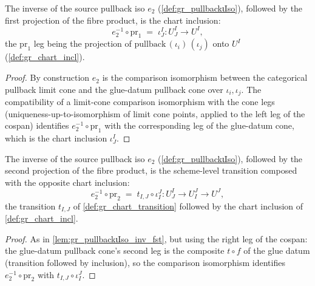 \begin{lemma}\leanok
  \label{lem:gr_pullbackιIso_inv_fst}
  The inverse of the source pullback iso \(e_2\) (\cref{def:gr_pullbackιIso}),
  followed by the first projection of the fibre product, is the chart inclusion:
  \[
    e_2^{-1} \circ \mathrm{pr}_1 \;=\; \iota^I_J : U^I_J \to U^I ,
  \]
  the \(\mathrm{pr}_1\) leg being the projection of
  \(\mathrm{pullback}\,(\iota_i)\,(\iota_j)\) onto \(U^I\)
  (\cref{def:gr_chart_incl}).
\end{lemma}
\begin{proof}
  \leanok
  By construction \(e_2\) is the comparison isomorphism between the categorical
  pullback limit cone and the glue-datum pullback cone over \(\iota_i, \iota_j\).
  The compatibility of a limit-cone comparison isomorphism with the cone legs
  (uniqueness-up-to-isomorphism of limit cone points, applied to the left leg of
  the cospan) identifies \(e_2^{-1} \circ \mathrm{pr}_1\) with the corresponding
  leg of the glue-datum cone, which is the chart inclusion \(\iota^I_J\).
\end{proof}

\begin{lemma}\leanok
  \label{lem:gr_pullbackιIso_inv_snd}
  The inverse of the source pullback iso \(e_2\) (\cref{def:gr_pullbackιIso}),
  followed by the second projection of the fibre product, is the scheme-level
  transition composed with the opposite chart inclusion:
  \[
    e_2^{-1} \circ \mathrm{pr}_2
      \;=\; t_{I,J} \circ \iota^J_I : U^I_J \to U^J_I \to U^J ,
  \]
  the transition \(t_{I,J}\) of \cref{def:gr_chart_transition} followed by the
  chart inclusion of \cref{def:gr_chart_incl}.
\end{lemma}
\begin{proof}
  \leanok
  As in \cref{lem:gr_pullbackιIso_inv_fst}, but using the right leg of the cospan:
  the glue-datum pullback cone's second leg is the composite \(t \circ f\) of the
  glue datum (transition followed by inclusion), so the comparison isomorphism
  identifies \(e_2^{-1} \circ \mathrm{pr}_2\) with \(t_{I,J} \circ \iota^J_I\).
\end{proof}

